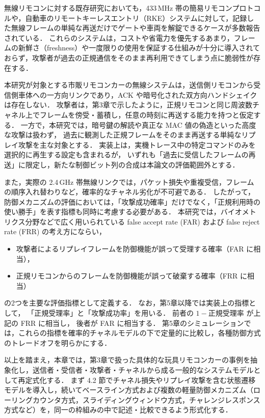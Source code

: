 \documentclass[twocolumn,10pt,a4paper]{jsarticle}
\begin{document}
無線リモコンに対する既存研究においても，433\,MHz 帯の簡易リモコンプロトコルや\cite{Mykhaylova2024RCReplay}，自動車のリモートキーレスエントリ（RKE）システム\cite{AbuAlHaija2022}に対して，記録した無線フレームの単純な再送だけでゲートや車両を解錠できるケースが多数報告されている．
これらのシステムは，コストや省電力を優先するあまり，フレームの新鮮さ（freshness）や一度限りの使用を保証する仕組みが十分に導入されておらず，攻撃者が過去の正規通信をそのまま再利用できてしまう点に脆弱性が存在する．

本研究が対象とする市販リモコンカーの無線システムは，送信側リモコンから受信側車体への一方向リンクであり，ACK や暗号化された双方向ハンドシェイクは存在しない．
攻撃者は，第3章で示したように，正規リモコンと同じ周波数チャネル上でフレームを傍受・蓄積し，任意の時刻に再送する能力を持つと仮定する．
一方で，本研究では，暗号鍵の解読や真正な MAC 値の偽造といった高度な攻撃は扱わず，
過去に観測した正規フレームをそのまま再送する単純なリプレイ攻撃を主な対象とする．
実装上は，実機トレース中の特定コマンドのみを選択的に再生する設定も含まれるが，
いずれも「過去に受信したフレームの再送」に限定し，新たな制御ビット列の合成は本論文の評価範囲外とする．

また，実際の 2.4\,GHz 帯無線リンクでは，パケット損失や重複受信，フレームの順序入れ替わりなど，確率的なチャネル劣化が不可避である．
したがって，防御メカニズムの評価においては，「攻撃成功確率」だけでなく，「正規利用時の使い勝手」を表す指標も同時に考慮する必要がある．
本研究では，バイオメトリクス分野などで広く用いられている\cite{FIDO} false accept rate (FAR) および false reject rate (FRR) の考え方にならい，

\begin{itemize}
  \item 攻撃者によるリプレイフレームを防御機能が誤って受理する確率（FAR に相当），
  \item 正規リモコンからのフレームを防御機能が誤って破棄する確率（FRR に相当）
\end{itemize}%
の2つを主要な評価指標として定義する．
なお，第5章以降では実装上の指標として，
「正規受理率」と「攻撃成功率」を用いる．
前者の $1 - \text{正規受理率}$ が上記の FRR に相当し，
後者が FAR に相当する．
第5章のシミュレーションでは，これらの指標を確率的チャネルモデルの下で定量的に比較し，各種防御方式のトレードオフを明らかにする．

以上を踏まえ，本章では，第3章で扱った具体的な玩具リモコンカーの事例を抽象化し，送信者・受信者・攻撃者・チャネルから成る一般的なシステムモデルとして再定式化する．
まず 4.2 節でチャネル損失やリプレイ攻撃を含む状態遷移モデルを導入し，続いてベースライン方式および複数の軽量防御メカニズム（ローリングカウンタ方式，スライディングウィンドウ方式，チャレンジレスポンス方式など）を，同一の枠組みの中で記述・比較できるよう形式化する．
\end{document}

